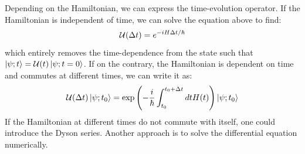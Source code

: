 Depending on the Hamiltonian, we can express the time-evolution operator. If the Hamiltonian is independent of time, we can solve the equation above to find:
\begin{equation}
    \mathcal{U}(\Delta t) = e^{-iH\Delta t/\hbar}
\end{equation}
which entirely removes the time-dependence from the state such that $\ket{\psi; t} = \mathcal{U}(t)\ket{\psi; t = 0}$. If on the contrary, the Hamiltonian is dependent on time and commutes at different times, we can write it as:
\begin{equation}
    \mathcal{U}(\Delta t)\ket{\psi; t_0} = \exp\left(-\frac{i}{\hbar}\int_{t_0}^{t_0 + \Delta t} dt H(t)\right)\ket{\psi; t_0}
\end{equation}
If the Hamiltonian at different times do not commute with itself, one could introduce the Dyson series\cite{sakurai_modern_2021}. Another approach is to solve the differential equation numerically.

